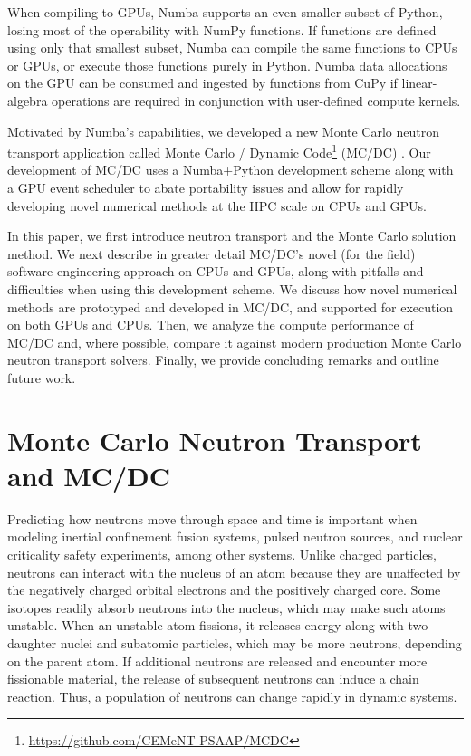 When compiling to GPUs, Numba supports an even smaller subset of Python, losing most of the operability with NumPy functions.
If functions are defined using only that smallest subset, Numba can compile the same functions to CPUs or GPUs, or execute those functions purely in Python.
Numba data allocations on the GPU can be consumed and ingested by functions from CuPy if linear-algebra operations are required in conjunction with user-defined compute kernels.

Motivated by Numba's capabilities, we developed a new Monte Carlo neutron transport application called Monte Carlo / Dynamic Code\footnote{\url{https://github.com/CEMeNT-PSAAP/MCDC}} (MC/DC) \cite{morgan_monte_2024, variansyah_mc23_mcdc}.
Our development of MC/DC uses a Numba+Python development scheme along with a GPU event scheduler to abate portability issues and allow for rapidly developing novel numerical methods at the HPC scale on CPUs and GPUs.

In this paper, we first introduce neutron transport and the Monte Carlo solution method.
We next describe in greater detail MC/DC's novel (for the field) software engineering approach on CPUs and GPUs, along with pitfalls and difficulties when using this development scheme.
We discuss how novel numerical methods are prototyped and developed in MC/DC, and supported for execution on both GPUs and CPUs.
Then, we analyze the compute performance of MC/DC and, where possible, compare it against modern production Monte Carlo neutron transport solvers.
Finally, we provide concluding remarks and outline future work.

\section{Monte Carlo Neutron Transport and MC/DC}

Predicting how neutrons move through space and time is important when modeling inertial confinement fusion systems, pulsed neutron sources, and nuclear criticality safety experiments, among other systems.
Unlike charged particles, neutrons can interact with the nucleus of an atom because they are unaffected by the negatively charged orbital electrons and the positively charged core.
Some isotopes readily absorb neutrons into the nucleus, which may make such atoms unstable.
When an unstable atom fissions, it releases energy along with two daughter nuclei and subatomic particles, which may be more neutrons, depending on the parent atom.
If additional neutrons are released and encounter more fissionable material, the release of subsequent neutrons can induce a chain reaction.
Thus, a population of neutrons can change rapidly in dynamic systems.

